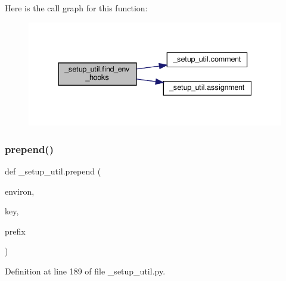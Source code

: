 Here is the call graph for this function\+:
\nopagebreak
\begin{figure}[H]
\begin{center}
\leavevmode
\includegraphics[width=337pt]{namespace__setup__util_a73de35ca77f260af6691470342ab49ce_cgraph}
\end{center}
\end{figure}
\mbox{\label{namespace__setup__util_ae78d86b2c4279f5b8b1acaa146c35802}} 
\subsubsection{\texorpdfstring{prepend()}{prepend()}}
{\footnotesize\ttfamily def \+\_\+setup\+\_\+util.\+prepend (\begin{DoxyParamCaption}\item[{}]{environ,  }\item[{}]{key,  }\item[{}]{prefix }\end{DoxyParamCaption})}



Definition at line 189 of file \+\_\+setup\+\_\+util.\+py.

